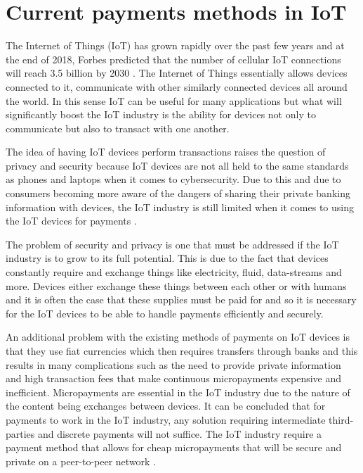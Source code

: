 \section{Current payments methods in IoT}

The Internet of Things (IoT) has grown rapidly over the past few years and at the end of 2018, Forbes predicted that the number of cellular IoT connections will reach 3.5 billion by 2030 \parencite{internet_forecasts}. The Internet of Things essentially allows devices connected to it, communicate with other similarly connected devices all around the world. In this sense IoT can be useful for many applications but what will significantly boost the IoT industry is the ability for devices not only to communicate but also to transact with one another.

The idea of having IoT devices perform transactions raises the question of privacy and security because IoT devices are not all held to the same standards as phones and laptops when it comes to cybersecurity. Due to this and due to consumers becoming more aware of the dangers of sharing their private banking information with devices, the IoT industry is still limited when it comes to using the IoT devices for payments \parencite{iot_light}.

The problem of security and privacy is one that must be addressed if the IoT industry is to grow to its full potential. This is due to the fact that devices constantly require and exchange things like electricity, fluid, data-streams and more. Devices either exchange these things between each other or with humans and it is often the case that these supplies must be paid for and so it is necessary for the IoT devices to be able to handle payments efficiently and securely.

An additional problem with the existing methods of payments on IoT devices is that they use fiat currencies which then requires transfers through banks and this results in many complications such as the need to provide private information and high transaction fees that make continuous micropayments expensive and inefficient. Micropayments are essential in the IoT industry due to the nature of the content being exchanges between devices. It can be concluded that for payments to work in the IoT industry, any solution requiring intermediate third-parties and discrete payments will not suffice. The IoT industry require a payment method that allows for cheap micropayments that will be secure and private on a peer-to-peer network \parencite{iot_light}.



